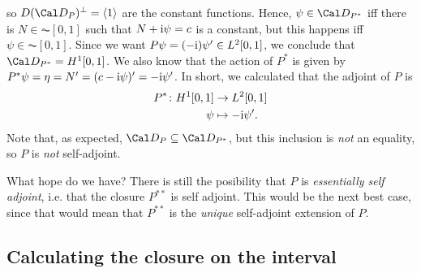 so \(D(\Cal D_P)^{\perp} = \langle 1\rangle\) are the constant
functions.
Hence, \(\psi\in\Cal D_{P^*}\) iff there is \(N\in\AC[0,1]\) such that
\(N+\mathrm{i}\psi = c\) is a constant, but this happens iff \(\psi\in\AC[0,1]\).
Since we want \(P\psi=(-\mathrm{i})\psi'\in L^{2}[0,1]\), we conclude that
\(\Cal D_{P^*}=H^{1}[0,1]\).
We also know that the action of \(P^*\) is given by
\(P^{*}\psi=\eta=N'=(c-\mathrm{i}\psi)'=-\mathrm{i}\psi'\). In short, we calculated
that the adjoint of \(P\) is
\begin{align}
  P^{*}\colon H^{1}[0,1] &\to L^{2}[0,1] \\
  \psi &\mapsto -\mathrm{i}\psi'
.\end{align}
Note that, as expected, \(\Cal D_P\subseteq \Cal D_{P^*}\), but this
inclusion is \emph{not} an equality, so \(P\) is \emph{not}
self-adjoint.

What hope do we have?
There is still the posibility that \(P\) is \emph{essentially self
adjoint}, i.e. that the closure \(P^{**}\) is self adjoint. This would
be the next best case, since that would mean that \(P^{**}\) is the
\emph{unique} self-adjoint extension of \(P\).

\subsection{Calculating the closure on the interval}

